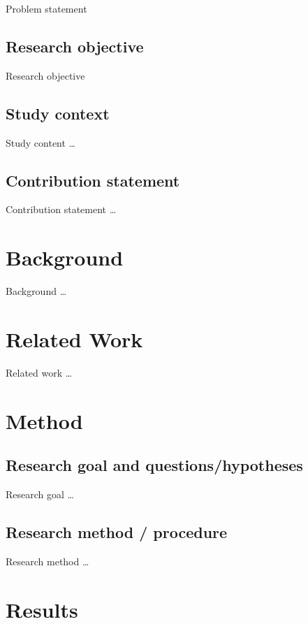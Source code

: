 \documentclass[]{einformatica}
\begin{document}
Problem statement

\subsection*{Research objective}

Research objective

\subsection*{Study context}

Study content \dots

\subsection*{Contribution statement}

Contribution statement \dots


\section{Background}\label{sec:Background}

Background \dots

\section{Related Work}\label{sec:RelatedWork}

Related work \dots

\section{Method}\label{sec:Method}
\subsection*{Research goal and questions/hypotheses}

Research goal \dots

\subsection*{Research method / procedure}

Research method \dots

\section{Results}\label{sec:Results}
\end{document}
